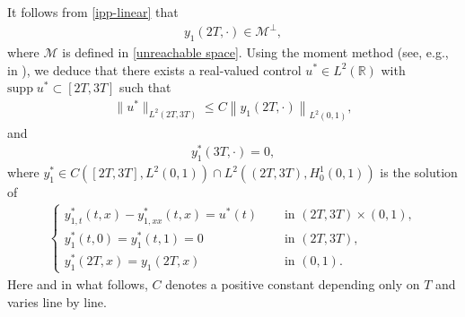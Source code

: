 \documentclass[11pt, reqno]{amsart}
\theoremstyle{plain}
\numberwithin{equation}{section}
\begin{document}
It follows from \eqref{ipp-linear} that
        \begin{align}	\label{y12T-ortho}
        y_1 \left(2T, \cdot \right) \in \mathscr{M}^{\bot}, 
        \end{align}
where $\mathscr{M}$ is defined in \eqref{unreachable space}.  Using the moment method (see, e.g.,  in ), we deduce that there exists a real-valued control $u^* \in L^2(\mathbb{R})$ with $\mathrm{supp} \; u^* \subset [2T, 3T]$ such that 
        \begin{align}	\label{chooseu*}
            \|u^*\|_{L^2(2T, 3T)} \leq C \left\|y_1\left(2T, \cdot \right) \right\|_{L^2(0, 1)},
        \end{align}
        and 
        \begin{align}	\label{y1*(T)=0}
  			y_1^*(3T, \cdot) = 0,      
        \end{align}
 where $y_1^* \in C([2T, 3T], L^2(0, 1)) \cap L^2\left((2T,3T), H^1_0(0, 1) \right)$ is the solution of
        \begin{align}	\label{sys-y*}
        \begin{cases}
            y_{1, t}^*(t,x) - y_{1, xx}^*(t,x) = u^*(t) \quad &\text{ in } (2T, 3T) \times (0, 1), \\[6pt]
            y_{1}^*(t, 0) = y_1^*(t, 1) = 0 &\text{ in } (2T, 3T), \\[6pt]
            y_{1}^*(2T, x) = y_1(2T, x) &\text{ in } (0, 1). 
        \end{cases}
        \end{align}
Here and in what follows, $C$ denotes a positive constant depending only on $T$ and varies line by line.     
		
		\medskip
		
\end{document}
